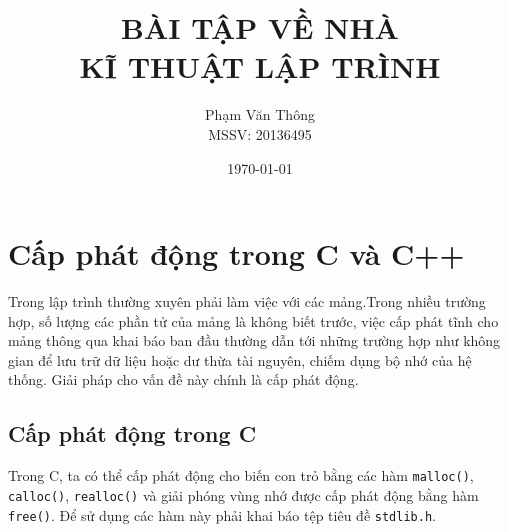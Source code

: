 \documentclass{article}
\title{\textbf{\Huge{BÀI TẬP VỀ NHÀ\\\Large{\textsc{KĨ THUẬT LẬP TRÌNH}}}}}
\author{Phạm Văn Thông\\MSSV: 20136495}
\date{}
\begin{document}
\maketitle
\begin{center} 
\date{\today}
\end{center}

\section{Cấp phát động trong C và C++}

Trong lập trình thường xuyên phải làm việc với các mảng.Trong nhiều trường hợp, số lượng các phần tử của mảng là không biết trước, việc cấp phát tĩnh cho mảng thông qua khai báo ban đầu thường dẫn tới những trường hợp như không gian để lưu trữ dữ liệu hoặc dư thừa tài nguyên, chiếm dụng bộ nhớ của hệ thống. Giải pháp cho vấn đề này chính là cấp phát động. 

\subsection{Cấp phát động trong C}

Trong C, ta có thể cấp phát động cho biến con trỏ bằng các hàm \texttt{malloc()}, \texttt{calloc()}, \texttt{realloc()} và giải phóng vùng nhớ được cấp phát động bằng hàm \texttt{free()}. Để sử dụng các hàm này phải khai báo tệp tiêu đề \texttt{stdlib.h}.
\end{document}
